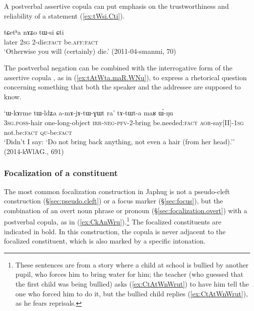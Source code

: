 A postverbal assertive copula can put emphasis on the trustworthiness and reliability of a statement  (\ref{ex:tWsi.Cti}).

\begin{exe}
\ex \label{ex:tWsi.Cti}
\gll  tɕetʰa nɤʑo tɯ-si ɕti \\
later \textsc{2sg} 2-die:\textsc{fact} be.\textsc{aff}:\textsc{fact} \\
\glt `Otherwise you will (certainly) die.' (2011-04-smanmi, 70)
\end{exe}

The postverbal negation  can be combined with the interrogative form of the assertive copula , as in (\ref{ex:tAtWta.maR.WNu}), to express a rhetorical question concerning something that both the speaker and the addressee are supposed to know.

\begin{exe}
\ex \label{ex:tAtWta.maR.WNu}
\gll `ɯ-kɤrme tɯ-ldʑa a-mɤ-jɤ-tɯ-ɣɯt ra' tɤ-tɯt-a maʁ ɯ́-ŋu \\
\textsc{3sg}.\textsc{poss}-hair one-long-object \textsc{irr}-\textsc{neg}-\textsc{pfv}-2-bring be.needed:\textsc{fact} \textsc{aor}-say[II]-\textsc{1sg} not.be:\textsc{fact} \textsc{qu}-be:\textsc{fact} \\
\glt `Didn't I say: `Do not bring back anything, not even a hair (from her head).'' (2014-kWlAG., 691)
\end{exe}

\subsubsection{Focalization of a constituent} \label{sec:focalization.final.copula}
The most common focalization construction in Japhug is not a pseudo-cleft construction (§\ref{sec:pseudo.cleft}) or a focus marker (§\ref{sec:focus}), but the combination of an overt noun phrase or pronoun (§\ref{sec:focalization.overt}) with a postverbal copula, as in (\ref{ex:CkAnWru}).\footnote{These sentences are from a story where a child at school is bullied by another pupil, who forces him to bring water for him; the teacher (who guessed that the first child was being bullied) asks (\ref{ex:CtAtWnWrut}) to have him tell the one who forced him to do it, but the bullied child replies (\ref{ex:CtAtWnWrut}), as he fears reprisals.} The focalized constituents are indicated in bold. In this construction, the copula is never adjacent to the focalized constituent, which is also marked by a specific intonation. 


